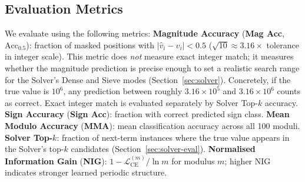 \subsection{Evaluation Metrics}
\label{sec:metrics}

We evaluate using the following metrics:
\textbf{Magnitude Accuracy} (\textbf{Mag Acc}, $\text{Acc}_{0.5}$): fraction of masked positions with
$|\hat{v}_i - v_i| < 0.5$ ($\sqrt{10}{\approx}3.16\times$ tolerance in integer scale).
This metric does \emph{not} measure exact integer match; it measures whether the magnitude
prediction is precise enough to set a realistic search range for the Solver's Dense and
Sieve modes (Section~\ref{sec:solver}). Concretely, if the true value is $10^6$, any
prediction between roughly $3.16 \times 10^5$ and $3.16 \times 10^6$ counts as correct.
Exact integer match is evaluated separately by Solver Top-$k$ accuracy.
\textbf{Sign Accuracy} (\textbf{Sign Acc}): fraction with correct predicted sign class.
\textbf{Mean Modulo Accuracy} (\textbf{MMA}): mean classification accuracy across all 100 moduli.
\textbf{Solver Top-$k$}: fraction of next-term instances where the true value appears in the
Solver's top-$k$ candidates (Section~\ref{sec:solver-eval}).
\textbf{Normalised Information Gain} (\textbf{NIG}): $1 - \mathcal{L}_{\text{CE}}^{(m)} / \ln m$
for modulus $m$; higher NIG indicates stronger learned periodic structure.
